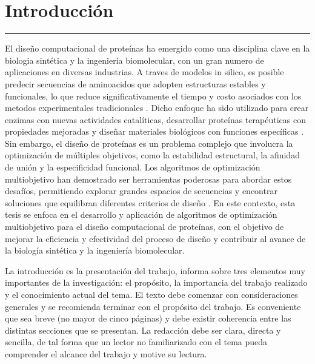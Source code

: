 \chapter{Introducci\'on}\label{capit:cap1}
\vspace{-2.0325ex}%
\noindent
\rule{\textwidth}{0.5pt}
\vspace{-5.5ex}%
\newcommand{\pushline}{\Indp}%

El diseño computacional de proteínas ha emergido como una disciplina clave en la biologia sintética y la ingeniería biomolecular, con un gran numero de aplicaciones en diversas industrias. A traves de modelos in silico, es posible predecir secuencias de aminoacidos que adopten estructuras estables y funcionales, lo que reduce significativamente el tiempo y costo asociados con los metodos experimentales tradicionales \citep{WOOLFSON2021167160}. Dicho enfoque ha sido utilizado para crear enzimas con nuevas actividades catalíticas, desarrollar proteínas terapéuticas con propiedades mejoradas y diseñar materiales biológicos con funciones específicas \citep{Huang2016, Kuhlman2003, Langan2019}. Sin embargo, el diseño de proteínas es un problema complejo que involucra la optimización de múltiples objetivos, como la estabilidad estructural, la afinidad de unión y la especificidad funcional. Los algoritmos de optimización multiobjetivo han demostrado ser herramientas poderosas para abordar estos desafíos, permitiendo explorar grandes espacios de secuencias y encontrar soluciones que equilibran diferentes criterios de diseño \citep{Deb2001}. En este contexto, esta tesis se enfoca en el desarrollo y aplicación de algoritmos de optimización multiobjetivo para el diseño computacional de proteínas, con el objetivo de mejorar la eficiencia y efectividad del proceso de diseño y contribuir al avance de la biología sintética y la ingeniería biomolecular.



La introducción es la presentación del trabajo, informa sobre tres elementos muy importantes de la investigación: el propósito, la importancia del trabajo realizado y el conocimiento actual del tema. El texto debe comenzar con consideraciones generales y se recomienda terminar con el propósito del trabajo. Es conveniente que sea breve (no mayor de cinco páginas) y debe existir coherencia entre las distintas secciones que se presentan. La redacción debe ser clara, directa y sencilla, de tal forma que un lector no familiarizado con el tema pueda comprender el alcance del trabajo y motive su lectura.

